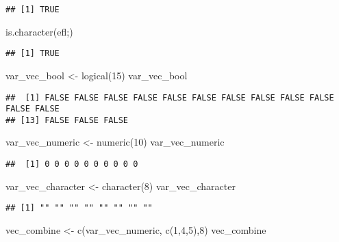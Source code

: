\documentclass[
]{article}
\newenvironment{Shaded}{\begin{snugshade}}{\end{snugshade}}
\newcommand{\DecValTok}[1]{\textcolor[rgb]{0.00,0.00,0.81}{#1}}
\newcommand{\FunctionTok}[1]{\textcolor[rgb]{0.00,0.00,0.00}{#1}}
\newcommand{\NormalTok}[1]{#1}
\newcommand{\OtherTok}[1]{\textcolor[rgb]{0.56,0.35,0.01}{#1}}
\newcommand{\StringTok}[1]{\textcolor[rgb]{0.31,0.60,0.02}{#1}}
\begin{document}
\begin{verbatim}
## [1] TRUE
\end{verbatim}

\begin{Shaded}
\begin{Highlighting}[]
\FunctionTok{is.character}\NormalTok{(}\StringTok{\textquotesingle{}efl;\textquotesingle{}}\NormalTok{)}
\end{Highlighting}
\end{Shaded}

\begin{verbatim}
## [1] TRUE
\end{verbatim}

\begin{Shaded}
\begin{Highlighting}[]
\NormalTok{var\_vec\_bool }\OtherTok{\textless{}{-}} \FunctionTok{logical}\NormalTok{(}\DecValTok{15}\NormalTok{)}
\NormalTok{var\_vec\_bool}
\end{Highlighting}
\end{Shaded}

\begin{verbatim}
##  [1] FALSE FALSE FALSE FALSE FALSE FALSE FALSE FALSE FALSE FALSE FALSE FALSE
## [13] FALSE FALSE FALSE
\end{verbatim}

\begin{Shaded}
\begin{Highlighting}[]
\NormalTok{var\_vec\_numeric }\OtherTok{\textless{}{-}} \FunctionTok{numeric}\NormalTok{(}\DecValTok{10}\NormalTok{)}
\NormalTok{var\_vec\_numeric}
\end{Highlighting}
\end{Shaded}

\begin{verbatim}
##  [1] 0 0 0 0 0 0 0 0 0 0
\end{verbatim}

\begin{Shaded}
\begin{Highlighting}[]
\NormalTok{var\_vec\_character }\OtherTok{\textless{}{-}} \FunctionTok{character}\NormalTok{(}\DecValTok{8}\NormalTok{)}
\NormalTok{var\_vec\_character}
\end{Highlighting}
\end{Shaded}

\begin{verbatim}
## [1] "" "" "" "" "" "" "" ""
\end{verbatim}

\begin{Shaded}
\begin{Highlighting}[]
\NormalTok{vec\_combine }\OtherTok{\textless{}{-}} \FunctionTok{c}\NormalTok{(var\_vec\_numeric, }\FunctionTok{c}\NormalTok{(}\DecValTok{1}\NormalTok{,}\DecValTok{4}\NormalTok{,}\DecValTok{5}\NormalTok{),}\DecValTok{8}\NormalTok{)}
\NormalTok{vec\_combine}
\end{Highlighting}
\end{Shaded}
\end{document}
